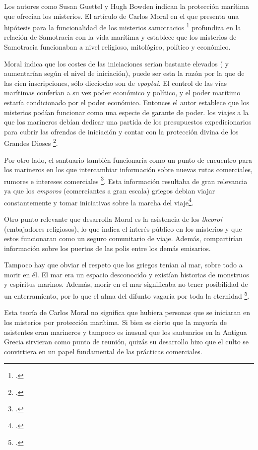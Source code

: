 Los autores como Susan Guettel y Hugh Bowden indican la protección marítima que ofrecían los misterios. El artículo de Carlos Moral en el que presenta una hipótesis para la funcionalidad de los misterios samotracios \footcite[]{moralgarciaInfluenciaMisteriosSamotracia2020} profundiza en la relación de Samotracia con la vida marítima y establece que los misterios de Samotracia funcionaban a nivel religioso, mitológico, político y económico. 

Moral indica que los costes de las iniciaciones serian bastante elevados ( y aumentarían según el nivel de iniciación), puede ser esta la razón por la que de las cien inscripciones, sólo dieciocho son de \textit{epoptai}. El control de las vías marítimas conferían a su vez poder económico y político, y el poder marítimo estaría condicionado por el poder económico. Entonces el autor establece que los misterios podían funcionar como una especie de garante de poder. los viajes a la que los marineros debían dedicar una partida de los presupuestos expedicionarios para cubrir las ofrendas de iniciación y contar con la protección divina de los Grandes Dioses \footcite[93]{moralgarciaInfluenciaMisteriosSamotracia2020}.

Por otro lado, el santuario también funcionaría como un punto de encuentro para los marineros en los que intercambiar información sobre nuevas rutas comerciales, rumores e intereses comerciales \footcite[95]{moralgarciaInfluenciaMisteriosSamotracia2020}. Esta información resultaba de gran relevancia ya que los \textit{emporos} (comerciantes a gran escala) griegos debian viajar constantemente y tomar iniciativas sobre la marcha del viaje\footcite[254]{villalbababiloniComerciantesGranEscala2022}.

Otro punto relevante que desarrolla Moral es la asistencia de los \textit{theoroi} (embajadores religiosos), lo que indica el interés público en los misterios y que estos funcionaran como un seguro comunitario de viaje. Además, compartirían información sobre los puertos de las polis entre los demás emisarios. 

Tampoco hay que obviar el respeto que los griegos tenían al mar, sobre todo a morir en él. El mar era un espacio desconocido y existían historias de monstruos y espíritus marinos. Además, morir en el mar significaba no tener posibilidad de un enterramiento, por lo que el alma del difunto vagaría por toda la eternidad \footcite[93]{fernandeznietoMorirAguaMorir2012}.  

Esta teoría de Carlos Moral no significa que hubiera personas que se iniciaran en los misterios por protección marítima. Si bien es cierto que la mayoría de asistentes eran marineros y tampoco es inusual que los santuarios en la Antigua Grecia sirvieran como punto de reunión, quizás su desarrollo hizo que el culto se convirtiera en un papel fundamental de las prácticas comerciales.
